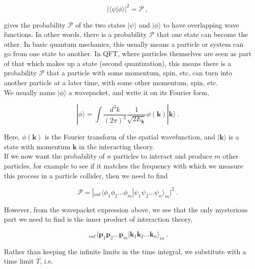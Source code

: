 \documentclass[10pt,twoside]{report}
\begin{document}
	\begin{equation*}
		|\langle \psi | \phi \rangle|^2 = \mathcal{P} \:,
	\end{equation*}
	
	\noindent gives the probability $\mathcal{P}$ of the two states $|\psi\rangle$ and $|\phi\rangle$ to have overlapping wave functions. In other words, there is a probability $\mathcal{P}$ that one state can become the other. In basic quantum mechanics, this usually means a particle or system can go from one state to another. In QFT, where particles themselves are seen as part of that which makes up a state (second quantization), this means there is a probability $\mathcal{P}$ that a particle with some momentum, spin, etc, can turn into another particle at a later time, with some other momentum, spin, etc.\\
	
	We usually name $|\phi\rangle$ a wavepacket, and write it on its Fourier form,
	
	\begin{equation}
		|\phi\rangle = \int \frac{d^3 k}{(2\pi)^3}\frac{1}{\sqrt{2E_{\bm{k}}}}\phi(\bm{k})|\bm{k}\rangle\:.
	\end{equation}
	
	Here, $\phi(\bm{k})$ is the Fourier transform of the spatial wavefunction, and $|\bm{k}\rangle$ is a state with momentum $\bm{k}$ in the interacting theory.\\
	
	If we now want the probability of $n$ particles to interact and produce $m$ other particles, for example to see if it matches the frequency with which we measure this process in a particle collider, then we need to find
	
	\begin{equation}
		\mathcal{P} = |_{out}\langle \phi_1\phi_2\ldots\phi_m|\psi_1\psi_2\ldots\psi_n\rangle_{in}|^2 \:.
	\end{equation}
	
	However, from the wavepacket expression above, we see that the only mysterious part we need to find is the inner product of interaction theory,
	
	\begin{equation}
		\:_{out}\langle \bm{p}_1\bm{p}_2\ldots\bm{p}_m|\bm{k}_1\bm{k}_2\ldots\bm{k}_n\rangle_{in} \:.
	\end{equation}
	
	Rather than keeping the infinite limits in the time integral, we substitute with a time limit $T$, i.e.
	
\end{document}
